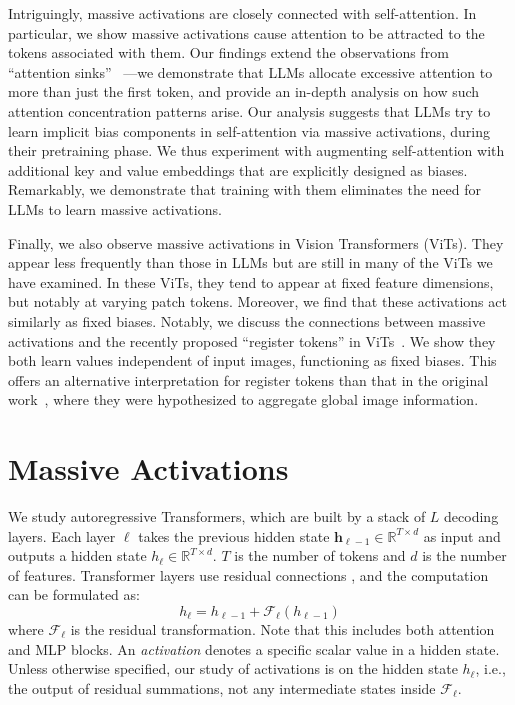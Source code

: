 \documentclass[10pt]{article}
\theoremstyle{definition}
\theoremstyle{plain}
\newcommand{\mbf}[1]{\mathbf{#1}}
\begin{document}
Intriguingly, massive activations are closely connected with self-attention. In particular, we show massive activations cause attention to be attracted to the tokens associated with them. Our findings extend the observations from ``attention sinks'' ~\citep{xiao2023sink}---we demonstrate that LLMs allocate excessive attention to more than just the first token, and provide an in-depth analysis on how such attention concentration patterns arise. Our analysis suggests that LLMs try to learn implicit bias components in self-attention via massive activations, during their pretraining phase. We thus experiment with augmenting self-attention with additional key and value embeddings that are explicitly designed as biases. Remarkably, we demonstrate that training with them eliminates the need for LLMs to learn massive activations.

Finally, we also observe massive activations in Vision Transformers (ViTs). They appear less frequently than those in LLMs but are still in many of the ViTs we have examined. In these ViTs, they tend to appear at fixed feature dimensions, but notably at varying patch tokens. Moreover, we find that these activations act similarly as fixed biases. Notably, we discuss the connections between massive activations and the recently proposed ``register tokens'' in ViTs~\citep{darcet2023register}. We show they both learn values independent of input images, functioning as fixed biases. This offers an alternative interpretation for register tokens than that in the original work~\citep{darcet2023register}, where they were hypothesized to aggregate global image information. 


\section{Massive Activations}\label{section-def}
We study autoregressive Transformers, which are built by a stack of $L$ decoding layers. Each layer $\ell$ takes the previous hidden state $\mbf{h}_{\ell-1}\in \mathbb{R}^{T\times d}$ as input and outputs a hidden state $h_{\ell}\in \mathbb{R}^{T\times d}$. $T$ is the number of tokens and $d$ is the number of features. Transformer layers use residual connections \citep{he2016resnet}, and the computation can be formulated as:
\begin{equation}
    h_{\ell} = h_{\ell-1} + \mathcal{F}_{\ell}(h_{\ell-1})
\end{equation}
where $\mbf{\mathcal{F}_{\ell}}$ is the residual transformation. Note that this includes both attention and MLP blocks. An \emph{activation} denotes a specific scalar value in a hidden state. Unless otherwise specified, our study of  activations is  on the hidden state $h_{\ell}$, i.e., the output of residual summations, not any intermediate states inside $\mbf{\mathcal{F}_{\ell}}$.  
\end{document}
